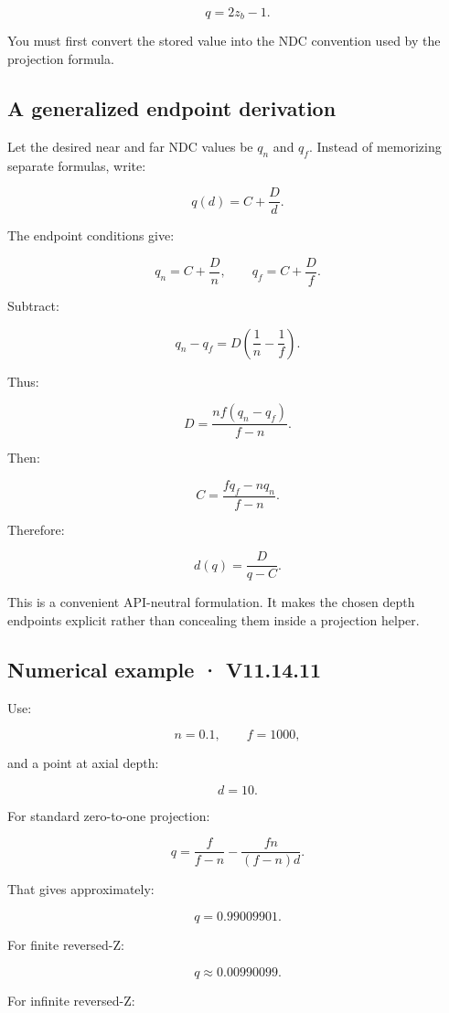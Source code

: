 \[ q=2z_b-1. \]

You must first convert the stored value into the NDC convention used by the projection formula.

\subsection{A generalized endpoint derivation}\label{02-foundations-ii-ch035-a-generalized-endpoint-derivation}

Let the desired near and far NDC values be \(q_n\) and \(q_f\). Instead of memorizing separate formulas, write:

\[ q(d)=C+\frac Dd. \]

The endpoint conditions give:

\[ q_n=C+\frac Dn, \qquad q_f=C+\frac Df. \]

Subtract:

\[ q_n-q_f=D\left(\frac1n-\frac1f\right). \]

Thus:

\[ \boxed{ D=\frac{nf(q_n-q_f)}{f-n}. } \]

Then:

\[ \boxed{ C=\frac{fq_f-nq_n}{f-n}. } \]

Therefore:

\[ \boxed{ d(q)=\frac D{q-C}. } \]

This is a convenient API-neutral formulation. It makes the chosen depth endpoints explicit rather than concealing them inside a projection helper.

\subsection{Numerical example · V11.14.11}\label{02-foundations-ii-ch035-numerical-example-v11.14.11}

Use:

\[ n=0.1,\qquad f=1000, \]

and a point at axial depth:

\[ d=10. \]

For standard zero-to-one projection:

\[ q=\frac f{f-n}-\frac{fn}{(f-n)d}. \]

That gives approximately:

\[ \boxed{q=0.99009901}. \]

For finite reversed-Z:

\[ \boxed{q\approx0.00990099}. \]

For infinite reversed-Z:

